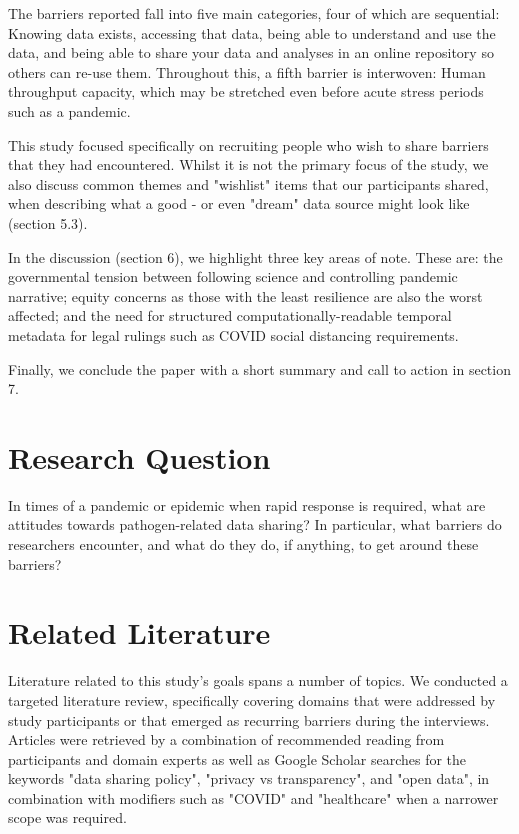 \documentclass{CUP-JNL-DAP}%
\begin{document}
The barriers reported fall into five main categories, four of which are sequential: Knowing data exists, accessing that data, being able to understand and use the data, and being able to share your data and analyses in an online repository so others can re-use them. Throughout this, a fifth barrier is interwoven: Human throughput capacity, which may be stretched even before acute stress periods such as a pandemic.

This study focused specifically on recruiting people who wish to share barriers that they had encountered. Whilst it is not the primary focus of the study, we also discuss common themes and "wishlist" items that our participants shared, when describing what a good - or even "dream" data source might look like (section 5.3).

In the discussion (section 6), we highlight three key areas of note. These are: the governmental tension between following science and controlling pandemic narrative; equity concerns as those with the least resilience are also the worst affected; and the need for structured computationally-readable temporal metadata for legal rulings such as COVID social distancing requirements. 

Finally, we conclude the paper with a short summary and call to action in section 7. 

\section{Research Question}
In times of a pandemic or epidemic when rapid response is required, what are attitudes towards pathogen-related data sharing? In particular, what barriers do researchers encounter, and what do they do, if anything, to get around these barriers? 

\section{Related Literature}

Literature related to this study's goals spans a number of topics. We conducted a targeted literature review, specifically covering domains that were addressed by study participants or that emerged as recurring barriers during the interviews. Articles were retrieved by a combination of recommended reading from participants and domain experts as well as Google Scholar searches for the keywords "data sharing policy", "privacy vs transparency", and "open data", in combination with modifiers such as "COVID" and "healthcare" when a narrower scope was required.
\end{document}

